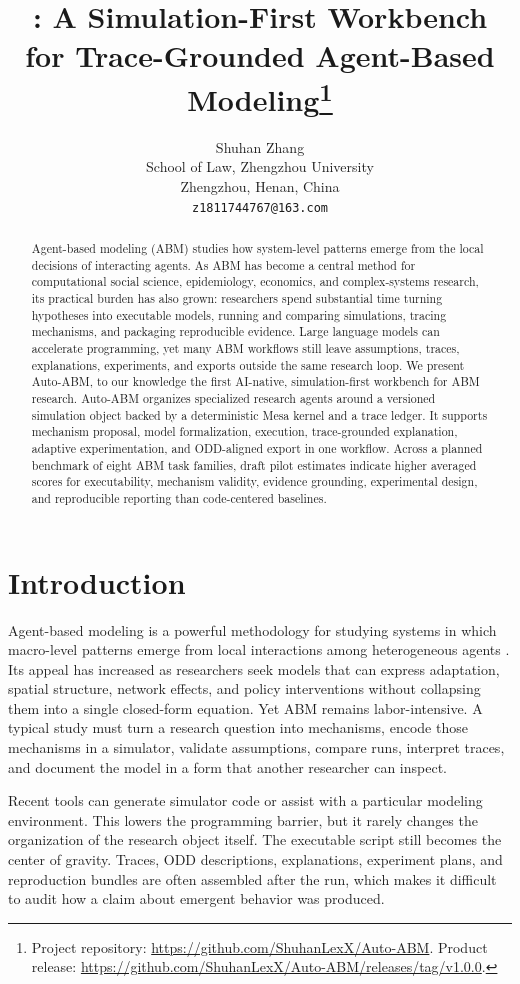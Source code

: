 \documentclass[11pt]{article}
\title{\sys: A Simulation-First Workbench for Trace-Grounded Agent-Based Modeling\thanks{Project repository: \url{https://github.com/ShuhanLexX/Auto-ABM}. Product release: \url{https://github.com/ShuhanLexX/Auto-ABM/releases/tag/v1.0.0}.}}
\author{Shuhan Zhang \\
  School of Law, Zhengzhou University \\
  Zhengzhou, Henan, China \\
  \texttt{z1811744767@163.com}}
\newcommand{\sys}{Auto-ABM}
\begin{document}
\maketitle

\begin{abstract}
Agent-based modeling (ABM) studies how system-level patterns emerge from the local decisions of interacting agents. As ABM has become a central method for computational social science, epidemiology, economics, and complex-systems research, its practical burden has also grown: researchers spend substantial time turning hypotheses into executable models, running and comparing simulations, tracing mechanisms, and packaging reproducible evidence. Large language models can accelerate programming, yet many ABM workflows still leave assumptions, traces, explanations, experiments, and exports outside the same research loop. We present \sys{}, to our knowledge the first AI-native, simulation-first workbench for ABM research. \sys{} organizes specialized research agents around a versioned simulation object backed by a deterministic Mesa kernel and a trace ledger. It supports mechanism proposal, model formalization, execution, trace-grounded explanation, adaptive experimentation, and ODD-aligned export in one workflow. Across a planned benchmark of eight ABM task families, draft pilot estimates indicate higher averaged scores for executability, mechanism validity, evidence grounding, experimental design, and reproducible reporting than code-centered baselines.
\end{abstract}

\section{Introduction}

Agent-based modeling is a powerful methodology for studying systems in which macro-level patterns emerge from local interactions among heterogeneous agents \citep{bonabeau2002abm,macal2010tutorial}. Its appeal has increased as researchers seek models that can express adaptation, spatial structure, network effects, and policy interventions without collapsing them into a single closed-form equation. Yet ABM remains labor-intensive. A typical study must turn a research question into mechanisms, encode those mechanisms in a simulator, validate assumptions, compare runs, interpret traces, and document the model in a form that another researcher can inspect.

Recent tools can generate simulator code or assist with a particular modeling environment. This lowers the programming barrier, but it rarely changes the organization of the research object itself. The executable script still becomes the center of gravity. Traces, ODD descriptions, explanations, experiment plans, and reproduction bundles are often assembled after the run, which makes it difficult to audit how a claim about emergent behavior was produced.
\end{document}
